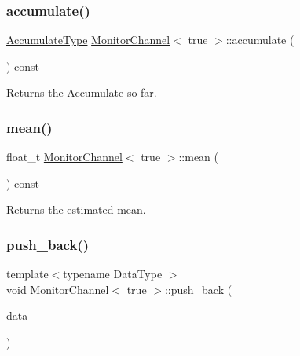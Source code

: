 \subsubsection{\texorpdfstring{accumulate()}{accumulate()}}
{\footnotesize\ttfamily \hyperlink{classMonitorChannel_3_01true_01_4_af2569e58417243595e129831ac287351}{Accumulate\+Type} \hyperlink{classMonitorChannel}{Monitor\+Channel}$<$ true $>$\+::accumulate (\begin{DoxyParamCaption}{ }\end{DoxyParamCaption}) const\hspace{0.3cm}{\ttfamily [inline]}}



Returns the {\ttfamily Accumulate} so far. 

\mbox{\label{classMonitorChannel_3_01true_01_4_a7b95a313ea0263842ff6190d38ff7d7f}} 
\subsubsection{\texorpdfstring{mean()}{mean()}}
{\footnotesize\ttfamily float\+\_\+t \hyperlink{classMonitorChannel}{Monitor\+Channel}$<$ true $>$\+::mean (\begin{DoxyParamCaption}{ }\end{DoxyParamCaption}) const\hspace{0.3cm}{\ttfamily [inline]}}



Returns the estimated mean. 

\mbox{\label{classMonitorChannel_3_01true_01_4_a5de2067c26c85de95bcaafe396a72471}} 
\subsubsection{\texorpdfstring{push\+\_\+back()}{push\_back()}}
{\footnotesize\ttfamily template$<$typename Data\+Type $>$ \\
void \hyperlink{classMonitorChannel}{Monitor\+Channel}$<$ true $>$\+::push\+\_\+back (\begin{DoxyParamCaption}\item[{Data\+Type}]{data }\end{DoxyParamCaption})\hspace{0.3cm}{\ttfamily [inline]}}



